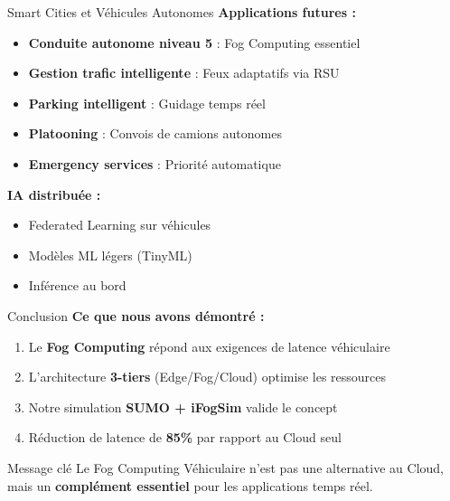 ﻿\documentclass[aspectratio=169,11pt]{beamer}
\begin{document}
\begin{frame}{Smart Cities et V\'ehicules Autonomes}
\textbf{Applications futures :}

\begin{itemize}
    \item \textbf{Conduite autonome niveau 5} : Fog Computing essentiel
    \item \textbf{Gestion trafic intelligente} : Feux adaptatifs via RSU
    \item \textbf{Parking intelligent} : Guidage temps r\'eel
    \item \textbf{Platooning} : Convois de camions autonomes
    \item \textbf{Emergency services} : Priorit\'e automatique
\end{itemize}

\vspace{0.3cm}
\textbf{IA distribu\'ee :}
\begin{itemize}
    \item Federated Learning sur v\'ehicules
    \item Mod\`eles ML l\'egers (TinyML)
    \item Inf\'erence au bord
\end{itemize}
\end{frame}

\begin{frame}{Conclusion}
\textbf{Ce que nous avons d\'emontr\'e :}

\begin{enumerate}
    \item Le \textbf{Fog Computing} r\'epond aux exigences de latence v\'ehiculaire
    \item L'architecture \textbf{3-tiers} (Edge/Fog/Cloud) optimise les ressources
    \item Notre simulation \textbf{SUMO + iFogSim} valide le concept
    \item R\'eduction de latence de \textbf{85\%} par rapport au Cloud seul
\end{enumerate}

\vspace{0.5cm}
\begin{block}{Message cl\'e}
Le Fog Computing V\'ehiculaire n'est pas une alternative au Cloud, mais un \textbf{compl\'ement essentiel} pour les applications temps r\'eel.
\end{block}
\end{frame}
\end{document}
